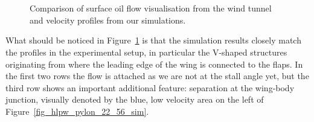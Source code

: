 \begin{figure}
  \\
  \quad
  \\
  \caption{Comparison of surface oil flow visualisation from the wind tunnel and velocity profiles from our simulations.}
  \label{fig_hlpw_oil}
\end{figure}
What should be noticed in Figure~\ref{fig_hlpw_oil} is that the simulation results closely match the profiles in the experimental setup, in particular the V-shaped structures originating from where the leading edge of the wing is connected to the flaps.
In the first two rows the flow is attached as we are not at the stall angle yet, but the third row shows an important additional feature: separation at the wing-body junction, visually denoted by the blue, low velocity area on the left of Figure~\ref{fig_hlpw_pylon_22_56_sim}.

